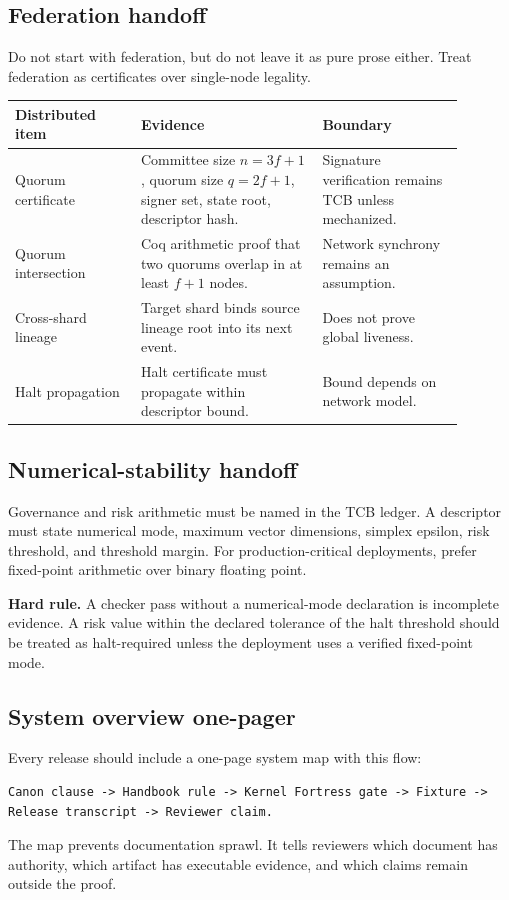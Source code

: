 \documentclass[11pt,oneside]{article}
\newenvironment{rulebox}{\begin{shaded}\noindent\textbf{Hard rule.} }{\end{shaded}}
\begin{document}
\subsection{Federation handoff}
Do not start with federation, but do not leave it as pure prose either. Treat federation as certificates over single-node legality.

\begin{longtable}{@{}p{0.25\linewidth}p{0.36\linewidth}p{0.28\linewidth}@{}}
\toprule
\textbf{Distributed item} & \textbf{Evidence} & \textbf{Boundary} \\
\midrule
Quorum certificate & Committee size \(n=3f+1\), quorum size \(q=2f+1\), signer set, state root, descriptor hash. & Signature verification remains TCB unless mechanized. \\
Quorum intersection & Coq arithmetic proof that two quorums overlap in at least \(f+1\) nodes. & Network synchrony remains an assumption. \\
Cross-shard lineage & Target shard binds source lineage root into its next event. & Does not prove global liveness. \\
Halt propagation & Halt certificate must propagate within descriptor bound. & Bound depends on network model. \\
\bottomrule
\end{longtable}

\subsection{Numerical-stability handoff}
Governance and risk arithmetic must be named in the TCB ledger. A descriptor must state numerical mode, maximum vector dimensions, simplex epsilon, risk threshold, and threshold margin. For production-critical deployments, prefer fixed-point arithmetic over binary floating point.

\begin{rulebox}
A checker pass without a numerical-mode declaration is incomplete evidence. A risk value within the declared tolerance of the halt threshold should be treated as halt-required unless the deployment uses a verified fixed-point mode.
\end{rulebox}

\subsection{System overview one-pager}
Every release should include a one-page system map with this flow:
\begin{lstlisting}[caption={System evidence flow.}]
Canon clause -> Handbook rule -> Kernel Fortress gate -> Fixture -> Release transcript -> Reviewer claim.
\end{lstlisting}
The map prevents documentation sprawl. It tells reviewers which document has authority, which artifact has executable evidence, and which claims remain outside the proof.
\end{document}
